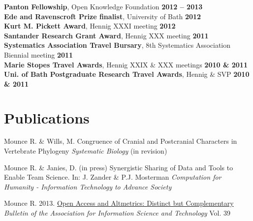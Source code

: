 \documentclass[margin,line]{resume}
\begin{document}
\begin{resume}
   \textbf{Panton Fellowship}, Open Knowledge Foundation \hfill \textbf{2012 -- 2013} \vspace{1mm}\\%
    \textbf{Ede and Ravenscroft Prize finalist}, University of Bath \hfill \textbf{2012}  \vspace{1mm}\\%
    \textbf{Kurt M. Pickett Award}, Hennig XXXI meeting \hfill \textbf{2012}  \vspace{1mm}\\%
    \textbf{Santander Research Grant Award}, Hennig XXX meeting \hfill \textbf{2011}      \vspace{1mm}\\%
    \textbf{Systematics Association Travel Bursary}, 8th Systematics Association Biennial meeting \hfill \textbf{2011} \vspace{1mm}\\%
    \textbf{Marie Stopes Travel Awards}, Hennig XXIX \& XXX meetings \hfill \textbf{2010 \& 2011}    \vspace{1mm}\\%
    \textbf{Uni. of Bath Postgraduate Research Travel Awards}, Hennig \& SVP \hfill \textbf{2010 \& 2011} \vspace{1mm}\\

\vspace{-7 mm}
    \section{\mysidestyle Publications}
    Mounce R. \& Wills, M. Congruence of Cranial and Postcranial Characters in Vertebrate Phylogeny \textsl{Systematic Biology} (in revision)

\vspace{-2mm}
    Mounce R. \& Janies, D. (in press) Synergistic Sharing of Data and Tools to Enable Team Science.
    In: J. Zander \& P.J. Mosterman
    \textsl{Computation for Humanity - Information Technology to Advance Society}

\vspace{-2mm}
    Mounce R. 2013.  \href{http://www.asis.org/Bulletin/Apr-13/AprMay13_Mounce.pdf}{Open Access and Altmetrics: Distinct but Complementary} \\ \textsl{Bulletin of the Association for Information Science and Technology} Vol. 39


\end{resume}
\end{document}
